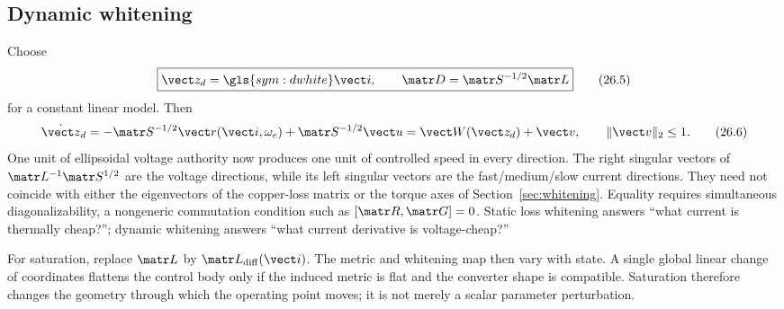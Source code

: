 

\subsection{Dynamic whitening}

Choose
\[
 \boxed{\vect z_d=\gls{sym:dwhite}\vect i,
 \qquad \matr D=\matr S^{-1/2}\matr L}
 \tag{26.5}
\]
for a constant linear model.  Then
\[
 \dot{\vect z}_d=-\matr S^{-1/2}\vect r(\vect i,\omega_e)
                 +\matr S^{-1/2}\vect u
             =\vect W(\vect z_d)+\vect v,
 \qquad \|\vect v\|_2\leq1.
 \tag{26.6}
\]
One unit of ellipsoidal voltage authority now produces one unit of controlled
speed in every direction.  The right singular vectors of
\(\matr L^{-1}\matr S^{1/2}\) are the voltage directions, while its left
singular vectors are the fast/medium/slow current directions.  They need not
coincide with either the eigenvectors of the copper-loss matrix or the torque
axes of Section~\ref{sec:whitening}.  Equality requires simultaneous
diagonalizability, a nongeneric commutation condition such as
\([
\matr R,\matr G]=0\).  Static loss whitening answers ``what current is
thermally cheap?''; dynamic whitening answers ``what current derivative is
voltage-cheap?''

For saturation, replace \(\matr L\) by \(\matr L_{\mathrm{diff}}(\vect i)\).
The metric and whitening map then vary with state.  A single global linear
change of coordinates flattens the control body only if the induced metric is
flat and the converter shape is compatible.  Saturation therefore changes the
geometry through which the operating point moves; it is not merely a scalar
parameter perturbation.
